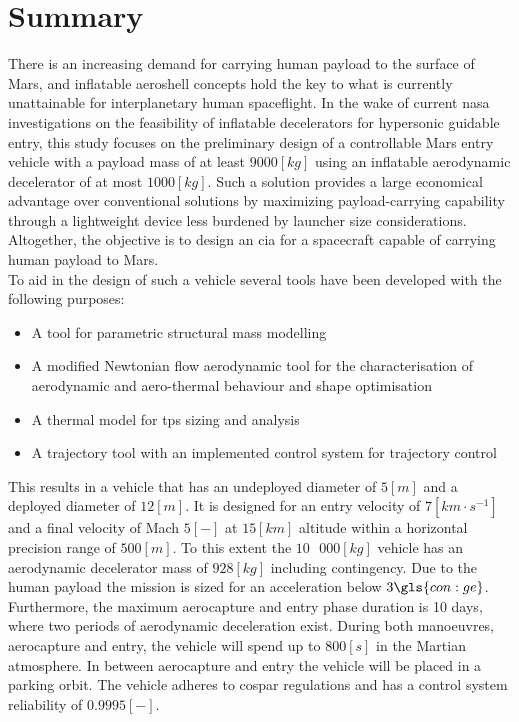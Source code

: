 \section*{Summary}\label{cha:summary}
There is an increasing demand for carrying human payload to the surface of Mars, and inflatable aeroshell concepts hold the key to what is currently unattainable for interplanetary human spaceflight. In the wake of current \acrshort{nasa} investigations on the feasibility of inflatable decelerators for hypersonic guidable entry, this study focuses on the preliminary design of a controllable Mars entry vehicle with a payload mass of at least $9000 \left[kg\right]$ using an inflatable aerodynamic decelerator of at most $1000 \left[kg\right]$. Such a solution provides a large economical advantage over conventional solutions by maximizing payload-carrying capability through a lightweight device less burdened by launcher size considerations. Altogether, the objective is to design an \acrfull{cia} for a spacecraft capable of carrying human payload to Mars.\\

To aid in the design of such a vehicle several tools have been developed with the following purposes:

\begin{itemize}
\vspace{1mm}
\item A tool for parametric structural mass modelling
\item A modified Newtonian flow aerodynamic tool for the characterisation of aerodynamic and aero-thermal behaviour and shape optimisation
\item A thermal model for \acrlong{tps} sizing and analysis
\item A trajectory tool with an implemented control system for trajectory control
\end{itemize}

This results in a vehicle that has an undeployed diameter of $5 \left[ m \right] $ and a deployed diameter of $12 \left[ m \right]$. It is designed for an entry velocity of $7 \left[ km \cdot s^{-1} \right]$ and a final velocity of Mach $5 \left[-\right]$ at  $15 \left[ km \right] $ altitude within a horizontal precision range of $500 \left[ m \right]$. To this extent the $10\mbox{ }000 \left[ kg \right]$ vehicle has an aerodynamic decelerator mass of $928 \left[ kg \right] $ including contingency. Due to the human payload the mission is sized for an acceleration below $3\gls{con:ge}$. Furthermore, the maximum aerocapture and entry phase duration is 10 days, where two periods of aerodynamic deceleration exist. During both manoeuvres, aerocapture and entry, the vehicle will spend up to $800 \left[ s \right]$ in the Martian atmosphere. In between aerocapture and entry the vehicle will be placed in a parking orbit. The vehicle adheres to \acrfull{cospar} regulations and has a control system reliability of $0.9995 \left[ - \right] $.\\

